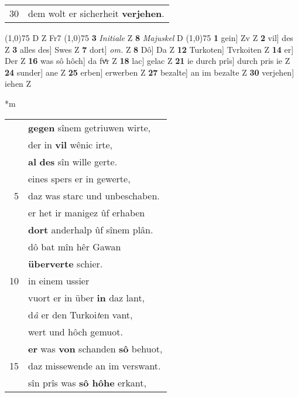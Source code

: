\documentclass[8pt,a4paper,notitlepage]{article}
\begin{document}
\begin{table}[ht]
\begin{minipage}[t]{0.5\linewidth}
\begin{tabular}{rl}
30 & dem wolt er sicherheit \textbf{verjehen}.\\ 
\end{tabular}
\scriptsize
\line(1,0){75} \newline
D Z Fr7 \newline
\line(1,0){75} \newline
\textbf{3} \textit{Initiale} Z  \textbf{8} \textit{Majuskel} D  \newline
\line(1,0){75} \newline
\textbf{1} gein] Zv Z \textbf{2} vil] des Z \textbf{3} alles des] Swes Z \textbf{7} dort] \textit{om.} Z \textbf{8} Dô] Da Z \textbf{12} Turkoten] Tvrkoiten Z \textbf{14} er] Der Z \textbf{16} was sô hôch] da fvͤr Z \textbf{18} lac] gelac Z \textbf{21} ie durch prîs] durch pris ie Z \textbf{24} sunder] ane Z \textbf{25} erben] erwerben Z \textbf{27} bezalte] an im bezalte Z \textbf{30} verjehen] iehen Z \newline
\end{minipage}
\hspace{0.5cm}
\begin{minipage}[t]{0.5\linewidth}
\small
\begin{center}*m
\end{center}
\begin{tabular}{rl}
 & \textbf{gegen} sînem getriuwen wirte,\\ 
 & der in \textbf{vil} wênic irte,\\ 
 & \textbf{al} \textbf{des} sîn wille gerte.\\ 
 & eines spers er in gewerte,\\ 
5 & daz was starc und unbeschaben.\\ 
 & er het ir manigez ûf erhaben\\ 
 & \textbf{dort} anderhalp ûf sînem plân.\\ 
 & dô bat mîn hêr Gawan\\ 
 & \textbf{überverte} schier.\\ 
10 & in einem ussier\\ 
 & vuort er in über \textbf{in} daz lant,\\ 
 & d\textit{â} er den Turkoi\textit{t}en vant,\\ 
 & wert und hôch gemuot.\\ 
 & \textbf{er} was \textbf{von} schanden \textbf{sô} behuot,\\ 
15 & daz missewende an im verswant.\\ 
 & sîn prîs was \textbf{sô hôhe} erkant,\\ 

\end{tabular}
\end{minipage}
\end{table}
\end{document}
